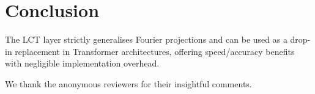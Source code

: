 \documentclass{article}
\newcommand{\LCT}{\textsc{LCT}}
\begin{document}
\section{Conclusion}\label{sec:conclusion}
The \LCT{} layer strictly generalises Fourier projections and can be used as a drop-in replacement in Transformer architectures, offering speed/accuracy benefits with negligible implementation overhead.

\begin{ack}
We thank the anonymous reviewers for their insightful comments.
\end{ack}



\end{document}
